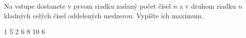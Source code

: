 




Na vstupe dostanete v prvom riadku zadaný počet čísel $n$ a v druhom riadku $n$ kladných celých
čísel oddelených medzerou. Vypíšte ich maximum.

1 5 2 6 8 10 6
\koniec


